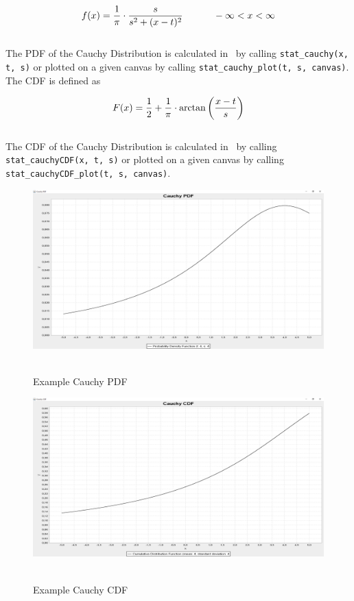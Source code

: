 		$$\displaystyle f(x) = \frac{1}{\pi} \cdot \frac{s}{s^2 + (x-t)^2} \quad \hspace{.3in} -\infty<x<\infty$$
		\\[0.3cm]
		The \ac{PDF} of the Cauchy Distribution is calculated in \setlx\ by calling \lstinline{stat_cauchy(x, t, s)} or plotted on a given canvas by calling \lstinline{stat_cauchy_plot(t, s, canvas)}.
		\\[0.3cm]
		The \ac{CDF} is defined as 

		$$\displaystyle F(x) = \frac{1}{2} + \frac{1}{\pi} \cdot \arctan\left(\frac{x-t}{s}\right)$$
		\\[0.3cm]
		The \ac{CDF} of the Cauchy Distribution is calculated in \setlx\ by calling \lstinline{stat_cauchyCDF(x, t, s)} or plotted on a given canvas by calling \lstinline{stat_cauchyCDF_plot(t, s, canvas)}.

		\begin{figure}[H]
			\centering
			\includegraphics[width=1\textwidth]{Figures/implemented_functions/cauchy_pdf}~\\
			\caption{Example Cauchy PDF}
			\label{fig:cauchy_pdf}
		\end{figure}


		\begin{figure}[H]
			\centering
			\includegraphics[width=1\textwidth]{Figures/implemented_functions/cauchy_cdf}~\\
			\caption{Example Cauchy CDF}
			\label{fig:cauchy_cdf}
		\end{figure}


